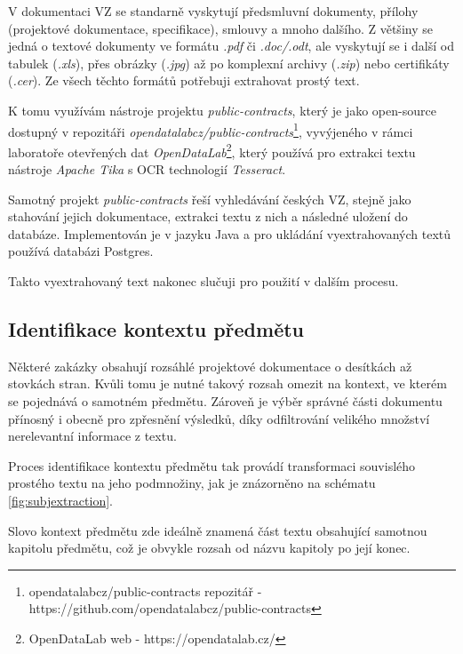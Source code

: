 \documentclass[thesis=M,czech]{FITthesis}[2019/12/23]
\begin{document}
V dokumentaci VZ se standarně vyskytují předsmluvní dokumenty, přílohy (projektové dokumentace, specifikace), smlouvy a mnoho dalšího. Z většiny se jedná o textové dokumenty ve formátu \textit{.pdf} či \textit{.doc/.odt}, ale vyskytují se i další od tabulek (\textit{.xls}), přes obrázky (\textit{.jpg}) až po komplexní archivy (\textit{.zip}) nebo certifikáty (\textit{.cer}). Ze všech těchto formátů potřebuji extrahovat prostý text.

K tomu využívám nástroje projektu \textit{public-contracts}, který je jako open-source dostupný v repozitáři \textit{opendatalabcz/public-contracts}\footnote{opendatalabcz/public-contracts repozitář - https://github.com/opendatalabcz/public-contracts}, vyvýjeného v rámci laboratoře otevřených dat \textit{OpenDataLab}\footnote{OpenDataLab web - https://opendatalab.cz/}, který používá pro extrakci textu nástroje \textit{Apache Tika} s OCR technologií \textit{Tesseract}.

Samotný projekt \textit{public-contracts} řeší vyhledávání českých VZ, stejně jako stahování jejich dokumentace, extrakci textu z nich a následné uložení do databáze. Implementován je v jazyku Java a pro ukládání vyextrahovaných textů používá databázi Postgres.

Takto vyextrahovaný text nakonec slučuji pro použití v dalším procesu.

\subsection{Identifikace kontextu předmětu}
\label{sec:subj_context_identification}

Některé zakázky obsahují rozsáhlé projektové dokumentace o desítkách až stovkách stran. Kvůli tomu je nutné takový rozsah omezit na kontext, ve kterém se pojednává o samotném předmětu. Zároveň je výběr správné části dokumentu přínosný i obecně pro zpřesnění výsledků, díky odfiltrování velikého množství nerelevantní informace z textu.

Proces identifikace kontextu předmětu tak provádí transformaci souvislého prostého textu na jeho podmnožiny, jak je znázorněno na schématu \ref{fig:subjextraction}.

Slovo kontext předmětu zde ideálně znamená část textu obsahující samotnou kapitolu předmětu, což je obvykle rozsah od názvu kapitoly po její konec.
\end{document}

